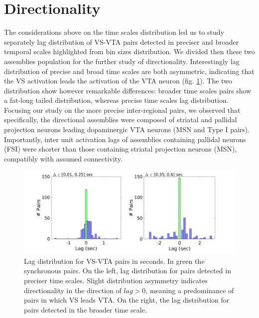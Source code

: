 \section{Directionality} 
The considerations above on the time scales distribution led us to study separately lag distribution of VS-VTA pairs detected in preciser and broader temporal scales highlighted from bin sizes distribution. We divided then these two assemblies population for the further study of directionality.
Interestingly lag distribution of precise and broad time scales are both asymmetric, indicating that the VS activation leads the activation of the VTA neuron (fig. \ref{fig:LagInSecAll}). The two distribution show however remarkable differences: broader time scales pairs show a fat-long tailed distribution, whereas precise time scales lag distribution.
Focusing our study on the more precise inter-regional pairs, we observed that specifically, the directional assemblies were composed of striatal and pallidal projection neurons leading dopaminergic VTA neurons (MSN and Type I pairs). Importantly, inter unit activation lags of assemblies containing pallidal neurons (FSI) were shorter than those containing striatal projection neurons (MSN), compatibly with assumed connectivity.
\begin{figure}[H]
\centering
\includegraphics[scale=0.3]{figures/LagGeneralInSec.png}
\caption{Lag distribution for VS-VTA pairs in seconds. In green the synchronous pairs. On the left, lag distribution for pairs detected in preciser time scales. Slight distribution asymmetry indicates directionality in the direction of $lag > 0$, meaning a predominance of pairs in which VS leads VTA. On the right, the lag distribution for pairs detected in the broader time scale.}
\label{fig:LagInSecAll}
\end{figure}


